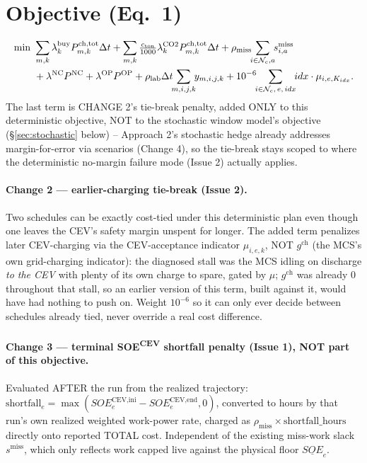 \documentclass[11pt]{article}
\newcommand{\dt}{\Delta t}
\begin{document}
\section{Objective (Eq.\ 1)}
\begin{align}
\min\ &\sum_{m,k}\lambda^{\text{buy}}_{k}P^{\text{ch,tot}}_{m,k}\dt
      +\sum_{m,k}\tfrac{c_{\text{ton}}}{1000}\lambda^{\text{CO2}}_{k}P^{\text{ch,tot}}_{m,k}\dt
      +\rho_{\text{miss}}\!\!\sum_{i\in\mathcal{N}_c,a}\!\! s^{\text{miss}}_{i,a}\notag\\
     &+\lambda^{\text{NC}}P^{\text{NC}}+\lambda^{\text{OP}}P^{\text{OP}}
      +\rho_{\text{lab}}\dt\!\!\sum_{m,i,j,k}\!\! y_{m,i,j,k}
      +10^{-6}\!\!\sum_{i\in\mathcal{N}_c,\,e,\,idx}\!\! idx\cdot \mu_{i,e,K_{idx}}.
\end{align}
The last term is CHANGE 2's tie-break penalty, added ONLY to this deterministic objective, NOT to
the stochastic window model's objective (\S\ref{sec:stochastic} below) -- Approach 2's stochastic
hedge already addresses margin-for-error via scenarios (Change 4), so the tie-break stays scoped to
where the deterministic no-margin failure mode (Issue 2) actually applies.

\paragraph{Change 2 --- earlier-charging tie-break (Issue 2).} Two schedules can be exactly
cost-tied under this deterministic plan even though one leaves the CEV's safety margin unspent for
longer. The added term penalizes later CEV-charging via the CEV-acceptance indicator
$\mu_{i,e,k}$, NOT $g^{\text{ch}}$ (the MCS's own grid-charging indicator): the diagnosed stall was
the MCS idling on discharge \emph{to the CEV} with plenty of its own charge to spare, gated by
$\mu$; $g^{\text{ch}}$ was already 0 throughout that stall, so an earlier version of this term,
built against it, would have had nothing to push on. Weight $10^{-6}$ so it can only ever decide
between schedules already tied, never override a real cost difference.

\paragraph{Change 3 --- terminal SOE\textsuperscript{CEV} shortfall penalty (Issue 1), NOT part of
this objective.} Evaluated AFTER the run from the realized trajectory:
$\text{shortfall}_e=\max(SOE^{\text{CEV,ini}}_e-SOE^{\text{CEV,end}}_e,0)$, converted to hours by
that run's own realized weighted work-power rate, charged as
$\rho_{\text{miss}}\times\text{shortfall\_hours}$ directly onto reported TOTAL cost. Independent of
the existing miss-work slack $s^{\text{miss}}$, which only reflects work capped live against the
physical floor $\underline{SOE}_e$.
\end{document}
